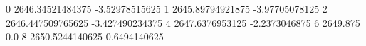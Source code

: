 0 2646.34521484375 -3.52978515625
1 2645.89794921875 -3.97705078125
2 2646.447509765625 -3.427490234375
4 2647.6376953125 -2.2373046875
6 2649.875 0.0
8 2650.5244140625 0.6494140625
